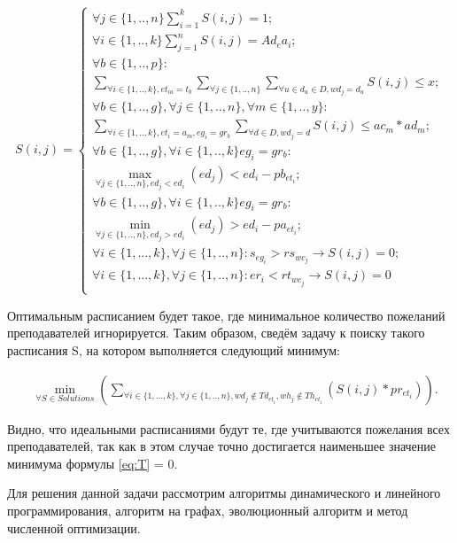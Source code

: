 \begin{equation}
	\label{eq:S}
	S(i,j) = 
	\begin{cases}
		\forall  j \in \{1,..,n\} \sum_{i=1}^kS(i,j) = 1;\\
		\forall  i \in \{1,..,k\} \sum_{j=1}^nS(i,j) = Ad_ea_i;\\
		\forall b \in \{1,..,p\} : \\ \sum_{\forall i \in \{1,..,k\}, et_{ia}=t_b}\sum_{\forall j \in \{1,..,n\}}\sum_{ \forall u \in d_u \in D, wd_j = d_u }S(i,j) \leq x;\\
		\forall b \in \{1,..,g\}, \forall j \in \{1,..,n\}, \forall m \in \{1,..,y\} :
		\\ \sum_{\forall i \in \{1,..,k\}, et_i = a_m,  eg_i=gr_b}\sum_{ \forall d \in D, wd_j = d }S(i,j) \leq ac_m * ad_m;\\
		\forall b \in \{1,..,g\}, \forall i \in \{1,..,k\} eg_i=gr_b: \\ \max\limits_{\forall j \in \{1,..,n\}, ed_j < ed_i}(ed_j) <ed_i-pb_{et_i};\\
		\forall b \in \{1,..,g\}, \forall i \in \{1,..,k\} eg_i=gr_b:\\ \min\limits_{\forall j \in \{1,..,n\}, ed_j > ed_i}(ed_j) >ed_i-pa_{et_i};\\
		\forall i \in \{1,...,k\}, \forall j \in \{1,..,n\} : s_{eg_i} > rs_{wc_j} \rightarrow S(i,j) = 0;\\
		\forall i \in \{1,...,k\}, \forall j \in \{1,..,n\} : er_i < rt_{wc_j} \rightarrow S(i,j) = 0\\
	\end{cases}
\end{equation}

Оптимальным расписанием будет такое, где минимальное количество пожеланий преподавателей игнорируется. Таким образом, сведём задачу к поиску такого расписания S, на котором выполняется следующий минимум:

\begin{align}
	\label{eq:T}
	& \min_{\forall S \in Solutions}(\sum_{\forall i \in \{1,...,k\}, \forall j \in \{1,..,n\}, wd_j \notin Td_{et_i}, wh_j \notin Th_{et_i}}(S(i,j)*pr_{et_i})).
\end{align}

Видно, что идеальными расписаниями будут те, где учитываются пожелания всех преподавателей, так как в этом случае точно достигается наименьшее значение минимума формулы \eqref{eq:T} = 0. 

Для решения данной задачи рассмотрим алгоритмы динамического и линейного программирования, алгоритм на графах, эволюционный алгоритм и метод численной оптимизации.

